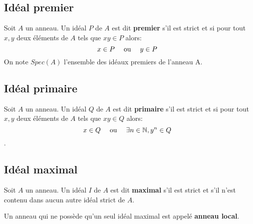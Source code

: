 \subsection{Idéal premier}
\begin{madefinition}
	Soit $A$ un anneau. Un idéal $P$ de $A$ est dit \textbf{premier} s'il est strict et si pour tout $x,y$ deux éléments de $A$ tels que $xy \in P$ alors: $$x \in P \text{ \quad ou \quad} y\in P$$
	On note $Spec(A)$ l’ensemble des idéaux premiers de l'anneau A. 
\end{madefinition}
\subsection{Idéal primaire}
\begin{madefinition}
	Soit $A$ un anneau. Un idéal $Q$ de $A$ est dit \textbf{primaire} s'il est strict et si pour tout $x,y$ deux éléments de $A$ tels que $xy \in Q$ alors: $$x \in Q \text{ \quad ou \quad} \exists n \in \mathbb{N}, y^{n} \in Q$$.
\end{madefinition}
\subsection{Idéal maximal}
\begin{madefinition}
	Soit $A$ un anneau. Un idéal $I$ de $A$ est dit \textbf{maximal} s'il est strict et s'il n'est contenu dans aucun autre idéal strict de $A$.
\end{madefinition}
\begin{maremarque}
	Un anneau qui ne possède qu'un seul idéal maximal est appelé \textbf{anneau local}.
\end{maremarque}
